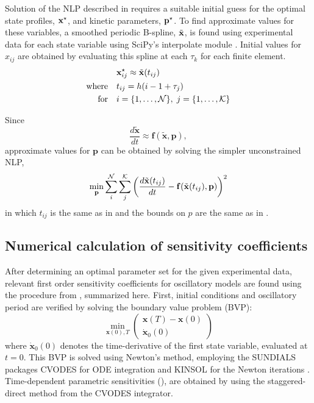 Solution of the NLP described in  requires a suitable initial guess for the optimal state profiles, ${\mathbf{x}}^\star$, and kinetic parameters, ${\mathbf{p}}^\star$. 
To find approximate values for these variables, a smoothed periodic B-spline, $\tilde{\mathbf{x}}$, is found using experimental data for each state variable using SciPy's interpolate module \cite{Jones}. 
Initial values for $x_{ij}$ are obtained by evaluating this spline at each $\tau_k$ for each finite element.
\begin{equation} \label{eq:approxz}
  \begin{aligned} &{\mathbf{x}}^\star_{ij} \approx \tilde{\mathbf{x}}(t_{ij}) \\ 
    \textrm{where} \quad & t_{ij} = h(i - 1 + \tau_j) \\
    \textrm{for} \quad & i = \{1,\ldots,{\cal N}\},\; j = \{1,\ldots,{\cal K}\}
  \end{aligned}
\end{equation}

Since
\begin{equation}
  \frac{d\tilde{\bm x}}{dt} \approx {\bm f}(\tilde{\bm x},{\bm p}),
\end{equation}
approximate values for $\bm p$ can be obtained by solving the simpler unconstrained NLP,
\begin{equation}
  \min_{\mathbf{p}} \sum_i^{{\cal N}}\sum_j^{{\cal K}}\left(\frac{d\tilde{\mathbf{x}}(t_{ij})}{dt} - {\mathbf{f}}(\tilde{\mathbf{x}}(t_{ij}),{\mathbf{p}})\right)^2
\end{equation}
in which $t_{ij}$ is the same as in  and the bounds on $p$ are the same as in .

\subsection{Numerical calculation of sensitivity coefficients}

After determining an optimal parameter set for the given experimental data, relevant first order sensitivity coefficients for oscillatory models are found using the procedure from \cite{Wilkins2009}, summarized here. 
First, initial conditions and oscillatory period are verified by solving the boundary value problem (BVP):
\begin{equation} \label{eq:bvp}
  \min_{{\bm x}(0),T} \left(\begin{array}{c} {\bm x}(T) - {\bm x}(0) \\ \dot{{\bm x}}_0(0)
  \end{array}\right)     
\end{equation}
where $\dot{{\bm x}}_0(0)$ denotes the time-derivative of the first state variable, evaluated at $t=0$. 
This BVP is solved using Newton's method, employing the SUNDIALS packages CVODES for ODE integration and KINSOL for the Newton iterations \cite{Hindmarsh2005}.
Time-dependent parametric sensitivities (), are obtained by using the staggered-direct method from the CVODES integrator. 

